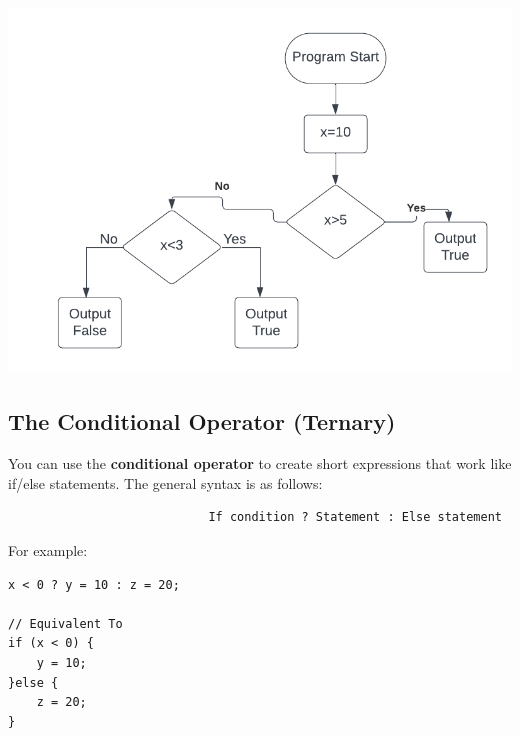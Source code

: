 \documentclass{report}
\begin{document}
    \begin{minipage}[]{0.3\textwidth}
        \begin{center}
            \includegraphics[scale=0.5]{./figures/flowchart3.png}
        \end{center} 
    \end{minipage}


    \bigbreak \noindent 
    \subsection{The Conditional Operator (Ternary)} 
    \bigbreak \noindent 
    \begin{concept}
 You can use the \textbf{conditional operator} to create short expressions that work like if/else statements. The general syntax is as follows:
	\end{concept}
    \smallbreak \noindent
    \sepline
    \begin{verbatim}
                            If condition ? Statement : Else statement
    \end{verbatim}
    \sepline
    \bigbreak \noindent 
    For example:
    \smallbreak \noindent
    \sepline
    \begin{verbatim}
x < 0 ? y = 10 : z = 20; 

// Equivalent To
if (x < 0) {
    y = 10;
}else {
    z = 20;
}
    \end{verbatim}
    \sepline

    \pagebreak \bigbreak \noindent 
\end{document}
